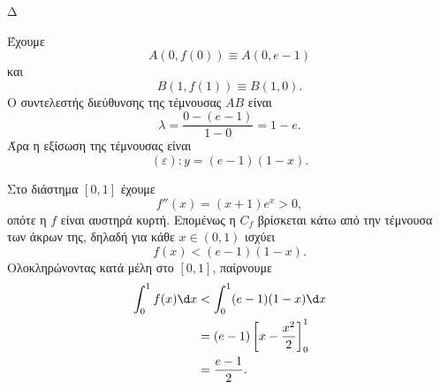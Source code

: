 \begin{thema}{Δ}
\begin{erwthma}
\item Έχουμε
\[
A(0,f(0))\equiv A(0,e-1)
\]
και
\[
B(1,f(1))\equiv B(1,0).
\]
Ο συντελεστής διεύθυνσης της τέμνουσας $AB$ είναι
\[
\lambda=\frac{0-(e-1)}{1-0}=1-e.
\]
Άρα η εξίσωση της τέμνουσας είναι
\[
(\varepsilon):{y=(e-1)(1-x)}.
\]

Στο διάστημα $[0,1]$ έχουμε
\[
f''(x)=(x+1)e^x>0,
\]
οπότε η $f$ είναι αυστηρά κυρτή. Επομένως η $C_f$ βρίσκεται κάτω από την τέμνουσα των άκρων της, δηλαδή για κάθε $x\in(0,1)$ ισχύει
\[
f(x)<(e-1)(1-x).
\]
Ολοκληρώνοντας κατά μέλη στο $[0,1]$, παίρνουμε
\begin{align*}
\int_0^1f(x)\d x
&<\int_0^1(e-1)(1-x)\d x\\
&=(e-1)\left[x-\frac{x^2}{2}\right]_0^1\\
&={\frac{e-1}{2}}.
\end{align*}
\end{erwthma}
\end{thema}

